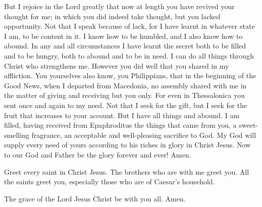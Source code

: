  But I rejoice in the Lord greatly that now at length you
have revived your thought for me; in which you did indeed take thought,
but you lacked opportunity.  Not that I speak because of
lack, for I have learnt in whatever state I am, to be content in it.
 I know how to be humbled, and I also know how to abound.
In any and all circumstances I have learnt the secret both to be filled
and to be hungry, both to abound and to be in need.  I can
do all things through Christ who strengthens me.  However
you did well that you shared in my affliction.  You
yourselves also know, you Philippians, that in the beginning of the Good
News, when I departed from Macedonia, no assembly shared with me in the
matter of giving and receiving but you only.  For even in
Thessalonica you sent once and again to my need.  Not that
I seek for the gift, but I seek for the fruit that increases to your
account.  But I have all things and abound. I am filled,
having received from Epaphroditus the things that came from you, a
sweet-smelling fragrance, an acceptable and well-pleasing sacrifice to
God.  My God will supply every need of yours according to
his riches in glory in Christ Jesus.  Now to our God and
Father be the glory forever and ever! Amen.

 Greet every saint in Christ Jesus. The brothers who are
with me greet you.  All the saints greet you, especially
those who are of Caesar's household.

 The grace of the Lord Jesus Christ be with you all. Amen.
